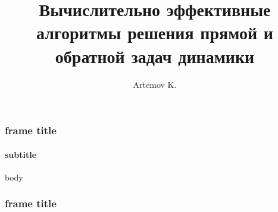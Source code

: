 \documentclass[10pt,pdf,hyperref={unicode}]{beamer}
\title{Вычислительно эффективные алгоритмы решения прямой и обратной задач динамики}
\subtitle{}
\author{Artemov K.}
\begin{document}
	
	\begin{frame}
		\titlepage
	\end{frame} 
	
	\begin{frame}
		\frametitle{frame title} 
		\framesubtitle{subtitle}
		body
	\end{frame}
	
	\begin{frame}
		\frametitle{frame title} 

			
	\end{frame}
	
\end{document}
